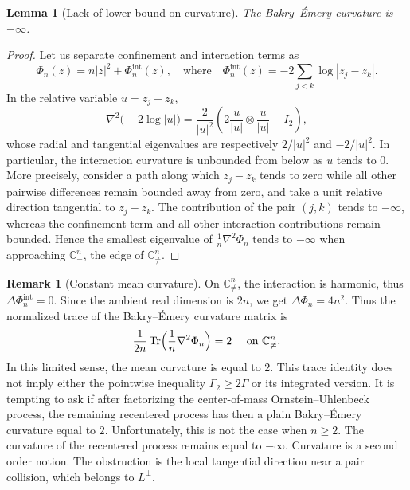 \documentclass[11pt,reqno]{amsart}
\numberwithin{equation}{section}%
\numberwithin{figure}{section}%
\numberwithin{table}{section}
\theoremstyle{plain}
\newtheorem{lemma}[theorem]{Lemma}
\theoremstyle{definition}
\newtheorem{remark}[theorem]{Remark}
\begin{document}
\begin{lemma}[Lack of lower bound on curvature]
  The Bakry--Émery curvature is $-\infty$.
\end{lemma}

\begin{proof} 
  Let us separate confinement and interaction terms as
  \begin{equation}
    \Phi_n(z) = n|z|^2+\Phi_n^{\mathrm{int}}(z),
    \quad\text{where}\quad
    \Phi_n^{\mathrm{int}}(z) = -2\sum_{j<k}\log|z_j-z_k|.
  \end{equation}
  In the relative variable $u=z_j-z_k$,
  \[
    \nabla^2\bigl(-2\log|u|\bigr)
    =
    \frac{2}{|u|^2}
    \left(
      2\frac{u}{|u|}\otimes\frac{u}{|u|}
      -
      I_2
    \right),
  \]
  whose radial and tangential eigenvalues are respectively $2/|u|^2$ and
  $-2/|u|^2$. In particular, the interaction curvature is unbounded from below
  as $u$ tends to $0$. More precisely, consider a path along which $z_j-z_k$
  tends to zero while all other pairwise differences remain bounded away from
  zero, and take a unit relative direction tangential to $z_j-z_k$. The
  contribution of the pair $(j,k)$ tends to $-\infty$, whereas the confinement
  term and all other interaction contributions remain bounded. Hence the
  smallest eigenvalue of $\frac{1}{n}\nabla^2\Phi_n$ tends to $-\infty$ when
  approaching $\mathbb{C}^n_{=}$, the edge of $\mathbb{C}^n_{\neq}$.
\end{proof}

\begin{remark}[Constant mean curvature]
  On $\mathbb{C}^n_{\neq}$, the interaction is harmonic, thus
  $\Delta\Phi_n^{\mathrm{int}}=0$. Since the ambient real dimension is $2n$,
  we get $\Delta\Phi_n=4n^2$. Thus the normalized trace of the Bakry--Émery
  curvature matrix is
  \begin{equation}\label{eq:mean-curvature-two}
    \frac{1}{2n}\operatorname{Tr}\Bigl(\frac{1}{n}\nabla^2\Phi_n\Bigr)=2
    \quad\text{ on }\mathbb{C}^n_{\neq}.
  \end{equation}
  In this limited sense, the mean curvature is equal to $2$. This trace
  identity does not imply either the pointwise inequality
  $\Gamma_2\geq2\Gamma$ or its integrated version. It is tempting to ask if
  after factorizing the center-of-mass Ornstein--Uhlenbeck process, the
  remaining recentered process has then a plain Bakry--Émery curvature equal
  to $2$. Unfortunately, this is not the case when $n\geq2$. The curvature of
  the recentered process remains equal to $-\infty$. Curvature is a second
  order notion. The obstruction is the local tangential direction near a pair
  collision, which belongs to $L^\perp$.
\end{remark}
\end{document}
